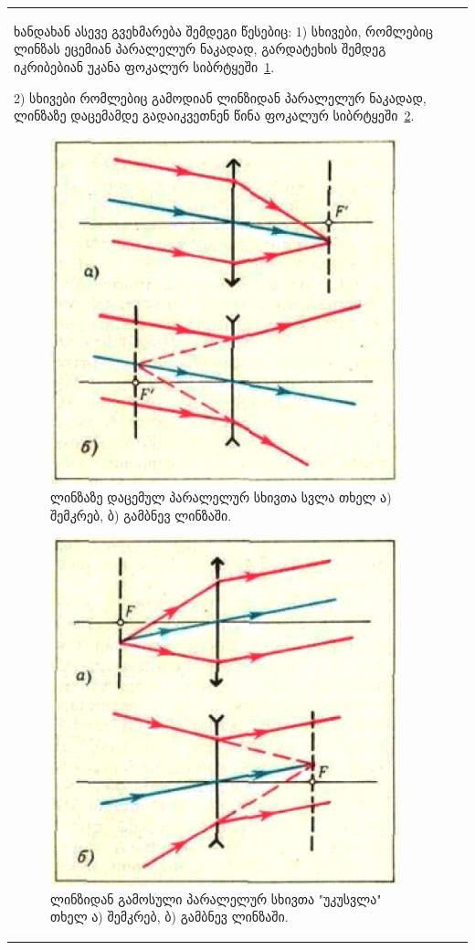 \documentclass{book}
\begin{document}
\begin{tabular}{|l|c|c|}
ხანდახან ასევე გვეხმარება შემდეგი წესებიც:
1) სხივები, რომლებიც ლინზას ეცემიან პარალელურ ნაკადად, გარდატეხის შემდეგ იკრიბებიან უკანა ფოკალურ სიბრტყეში~\ref{fig:optics_2}.

2) სხივები რომლებიც გამოდიან ლინზიდან პარალელურ ნაკადად, ლინზაზე დაცემამდე გადაიკვეთნენ წინა ფოკალურ სიბრტყეში~\ref{fig:optics_3}. 

		\begin{figure}[h]
		   \centering
           \includegraphics[width=0.5\columnwidth]{figures/optics_2}
           \caption{ლინზაზე დაცემულ პარალელურ სხივთა სვლა თხელ ა) შემკრებ, ბ) გამბნევ ლინზაში.}
           \label{fig:optics_2}
        \end{figure}

		\begin{figure}[h]
		   \centering
           \includegraphics[width=0.5\columnwidth]{figures/optics_3}
           \caption{ლინზიდან გამოსული პარალელურ სხივთა "უკუსვლა" თხელ ა) შემკრებ, ბ) გამბნევ ლინზაში.}
           \label{fig:optics_3}
        \end{figure}


\end{tabular}
\end{document}
